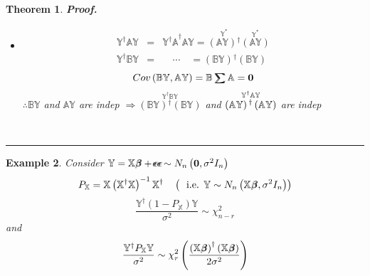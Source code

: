 \documentclass{article}
\newtheorem{theorem}{Theorem}
\newtheorem{example}[theorem]{Example}
\newenvironment{proof}[1][Proof]{\noindent\textbf{#1.} }{\ \rule{0.5em}{0.5em}}
\begin{document}
\begin{theorem}
\begin{proof}
\begin{itemize}
\item[Case 2] 
\begin{eqnarray*}
\mathbb{Y^{\dagger }AY} &=&\mathbb{Y^{\dagger }A}^{\dagger }\mathbb{AY}=%
\overset{\mathbb{Y}^{\ast }}{\left( \mathbb{AY}\right) \mathbb{^{\dagger }}}%
\overset{\mathbb{Y}^{\ast }}{\left( \mathbb{AY}\right) } \\
\mathbb{Y^{\dagger }BY} &=&\quad \mathbb{\cdots }\quad =\left( \mathbb{BY}%
\right) \mathbb{^{\dagger }}\left( \mathbb{BY}\right) 
\end{eqnarray*}%
\begin{equation*}
Cov\left( \mathbb{BY},\mathbb{AY}\right) =\mathbb{B}%
\tsum\mkern-20mu\tsum%
\mathbb{A}=\boldsymbol{0}
\end{equation*}%
$\therefore \mathbb{BY}$ and $\mathbb{AY}$ are indep\newline
\newline
$\Rightarrow \overset{\mathbb{Y^{\dagger }BY}}{\left( \mathbb{BY}\right) 
\mathbb{^{\dagger }}\left( \mathbb{BY}\right) }$ and $\overset{\mathbb{%
Y^{\dagger }AY}}{\left( \mathbb{AY}\right) \mathbb{^{\dagger }}\left( 
\mathbb{AY}\right) }$ are indep
\end{itemize}
\end{proof}
\end{theorem}

\bigskip

\begin{example}
Consider $\mathbb{Y=X}%
\beta\mkern-9.6mu \beta%
+%
\epsilon\mkern-10mu \epsilon%
$\qquad $%
\epsilon\mkern-10mu \epsilon%
\sim N_{n}\left( \boldsymbol{0},\sigma ^{2}I_{n}\right) $%
\begin{equation*}
P_{\mathbb{X}}=\mathbb{X}\left( \mathbb{X}^{\dagger }\mathbb{X}\right) ^{-1}%
\mathbb{X}^{\dagger }\mathbb{\quad }\left( \text{i.e. }\mathbb{Y}\sim
N_{n}\left( \mathbb{X}%
\beta\mkern-9.6mu \beta%
,\sigma ^{2}I_{n}\right) \right) 
\end{equation*}%
\begin{equation*}
\frac{\mathbb{Y}^{\dagger }\left( 1-P_{\mathbb{X}}\right) \mathbb{Y}}{\sigma
^{2}}\sim \chi _{n-r}^{2}
\end{equation*}%
and%
\begin{equation*}
\frac{\mathbb{Y}^{\dagger }P_{\mathbb{X}}\mathbb{Y}}{\sigma ^{2}}\sim \chi
_{r}^{2}\left( \frac{\left( \mathbb{X}%
\beta\mkern-9.6mu \beta%
\right) ^{\dagger }\left( \mathbb{X}%
\beta\mkern-9.6mu \beta%
\right) }{2\sigma ^{2}}\right) 
\end{equation*}
\end{example}
\end{document}
